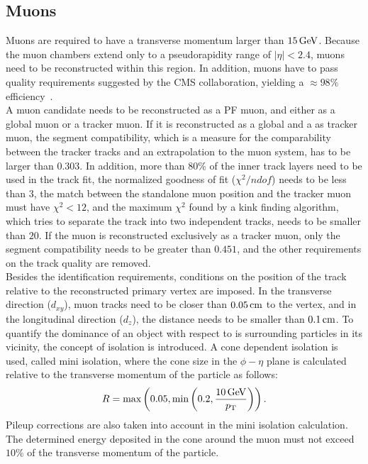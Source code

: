 \subsection{Muons}
Muons are required to have a transverse momentum larger than $15\,\text{Ge\hspace{-.08em}V}$. Because the muon chambers extend only to a pseudorapidity range of $|\eta|<2.4$, muons need to be reconstructed within this region. In addition, muons have to pass quality requirements suggested by the CMS collaboration, yielding a $\approx 98\%$ efficiency~\cite{MuonIDPerf}.\\
A muon candidate needs to be reconstructed as a PF muon, and either as a global muon or a tracker muon. If it is reconstructed as a global and a as tracker muon, the segment compatibility, which is a measure for the comparability between the tracker tracks and an extrapolation to the muon system, has to be larger than $0.303$. In addition, more than $80\%$ of the inner track layers need to be used in the track fit, the normalized goodness of fit ($\chi^2/ndof$) needs to be less than $3$, the match between the standalone muon position and the tracker muon must have $\chi^2<12$, and the maximum $\chi^2$ found by a kink finding algorithm, which tries to separate the track into two independent tracks, needs to be smaller than $20$. If the muon is reconstructed exclusively as a tracker muon, only the segment compatibility needs to be greater than $0.451$, and the other requirements on the track quality are removed.\\
Besides the identification requirements, conditions on the position of the track relative to the reconstructed primary vertex are imposed. In the transverse direction ($d_{xy}$), muon tracks need to be closer than $0.05\,\text{cm}$ to the vertex, and in the longitudinal direction ($d_z$), the distance needs to be smaller than $0.1\,\text{cm}$. To quantify the dominance of an object with respect to is surrounding particles in its vicinity, the concept of isolation is introduced. A cone dependent isolation is used, called mini isolation, where the cone size in the $\phi-\eta$ plane is calculated relative to the transverse momentum of the particle as follows:
\begin{equation}
 R = \text{max}\left(0.05,\text{min}\left(0.2,\frac{10\,\text{Ge\hspace{-.08em}V}}{p_{\mathrm{T}}}\right)\right).
\end{equation}
Pileup corrections are also taken into account in the mini isolation calculation.
The determined energy deposited in the cone around the muon must not exceed $10\%$ of the transverse momentum of the particle.



